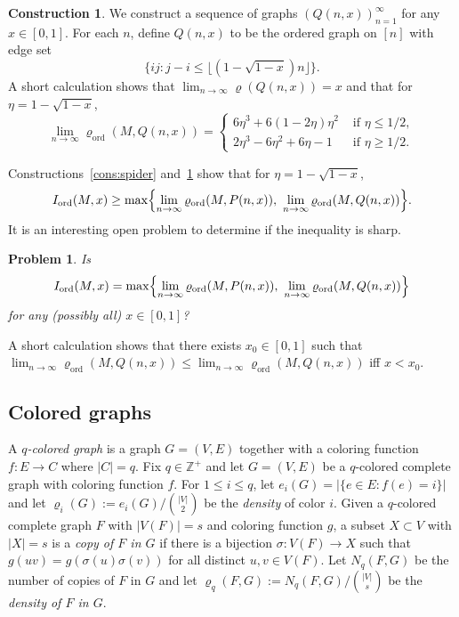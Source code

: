 \documentclass[11pt]{article}
\let\originalleft\left
\let\originalright\right
\renewcommand{\left}{\mathopen{}\mathclose\bgroup\originalleft}
\renewcommand{\right}{\aftergroup\egroup\originalright}
\newtheorem{prob}[thm]{Problem}
\newcommand{\ord}{{\operatorname{ord}}}
\theoremstyle{definition}
\newtheorem{cons}[thm]{Construction}
\newcommand{\brac}[1]{\left\{ #1 \right\}}
\newcommand{\Z}{\mathbb{Z}}
\begin{document}
\begin{cons}\label{cons:length}
    We construct a sequence of graphs $(Q(n,x))_{n = 1}^\infty$ for any $x \in [0,1]$. For each $n$, define $Q (n, x)$ to be the ordered graph on $[n]$ with edge set \[ \{ ij : j - i \leq \lfloor (1 - \sqrt{1 - x}) n \rfloor \} .\] A short calculation shows that $\lim_{n \to \infty} \varrho ( Q(n, x)) = x$ and  that for $\eta = 1 - \sqrt{1-x}$,  \[\lim_{n \to \infty} \varrho_\ord (M, Q(n, x)) = \begin{cases}
        6 \eta^3 + 6(1 - 2\eta) \eta^2 & \text{ if } \eta \le 1/2, \\
        2\eta^3 - 6 \eta^2 + 6\eta -1 & \text{ if } \eta \ge 1/2.
    \end{cases} \]
\end{cons}

Constructions~\ref{cons:spider} and~\ref{cons:length} show that for  $\eta = 1 - \sqrt{1-x}$,
\[I_{\ord} (M, x) \ge \max \brac{\lim_{n \to \infty} \varrho_\ord (M, P(n, x)),~ \lim_{n \to \infty} \varrho_\ord (M, Q(n, x))}.\]
It is an interesting open problem to determine if the inequality is sharp.

\begin{prob}
    Is
    \[I_{\ord} (M, x) = \max \brac{\lim_{n \to \infty} \varrho_\ord (M, P(n, x)),~ \lim_{n \to \infty} \varrho_\ord (M, Q(n, x))}\]
    for any (possibly all) $x \in [0,1]$?
\end{prob}

A short calculation shows that there exists $x_0 \in [0,1]$ such that $\lim_{n \to \infty} \varrho_\ord (M, Q(n, x)) \le \lim_{n \to \infty} \varrho_\ord (M, Q(n, x))$ iff $x<x_0$. 

\subsection{Colored graphs}\label{sec:intro_color}

A {\em $q$-colored graph} is a graph $G =(V, E)$ together with a coloring function $f: E\to C$ where $|C|=q$. Fix  $q \in \Z^+$ and let $G = (V, E)$ be a $q$-colored complete graph with coloring function $f$. For $1\le i \le q$, let $e_i (G) = | \{ e\in E : f(e) = i \} |$  and let $\varrho_i (G) := e_i (G) / \binom{|V|}{2}$ be the {\em density} of color $i$. Given a $q$-colored complete graph $F$ with $|V(F)|=s$ and coloring function $g$, a subset $X \subset V$ with $|X| = s$ is a {\em copy of $F$ in $G$} if there is a bijection $\sigma : V(F) \to X$ such that $g (uv) = g( \sigma(u) \sigma(v))$ for all distinct $u,v \in V(F)$.  Let $ N_q (F, G )$ be the number of copies of $F$ in $G$ and let $\varrho_q (F, G) := N_q (F, G ) / \binom{|V|}{s}$ be the {\em density of $F$ in $G$}.
\end{document}
